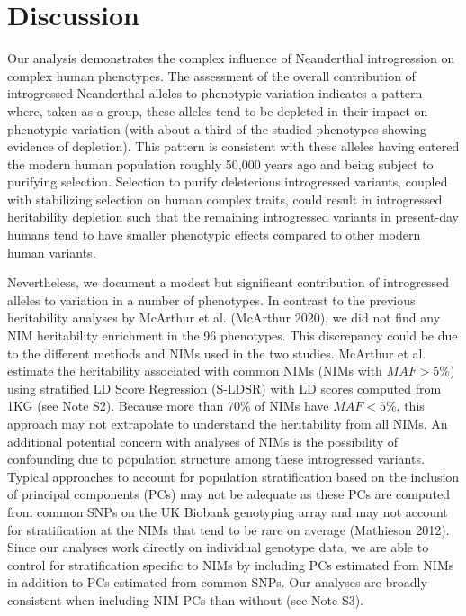 \section{Discussion}
Our analysis demonstrates the complex influence of Neanderthal introgression on complex human phenotypes. The assessment of the overall contribution of introgressed Neanderthal alleles to phenotypic variation indicates a pattern where, taken as a group, these alleles tend to be depleted in their impact on phenotypic variation (with about a third of the studied phenotypes showing evidence of depletion). This pattern is consistent with these alleles having entered the modern human population roughly 50,000 years ago and being subject to purifying selection. Selection to purify deleterious introgressed variants, coupled with stabilizing selection on human complex traits, could result in introgressed heritability depletion such that the remaining introgressed variants in present-day humans tend to have smaller phenotypic effects compared to other modern human variants. 

Nevertheless, we document a modest but significant contribution of introgressed alleles to variation in a number of phenotypes. In contrast to the previous heritability analyses by McArthur et al. (McArthur 2020), we did not find any NIM heritability enrichment in the 96 phenotypes. This discrepancy could be due to the different methods and NIMs used in the two studies. McArthur et al. estimate the heritability associated with common NIMs (NIMs with $MAF > 5\%$) using stratified LD Score Regression (S-LDSR) with LD scores computed from 1KG (see Note S2). Because more than 70\% of NIMs have $MAF < 5\%$, this approach may not extrapolate to understand the heritability from all NIMs. An additional potential concern with analyses of NIMs is the possibility of confounding due to population structure among these introgressed variants. Typical approaches to account for population stratification based on the inclusion of principal components (PCs) may not be adequate as these PCs are computed from common SNPs on the UK Biobank genotyping array and may not account for stratification at the NIMs that tend to be rare on average (Mathieson 2012). Since our analyses work directly on individual genotype data, we are able to control for stratification specific to NIMs by including PCs estimated from NIMs in addition to PCs estimated from common SNPs. Our analyses are broadly consistent when including NIM PCs than without (see Note S3). 

